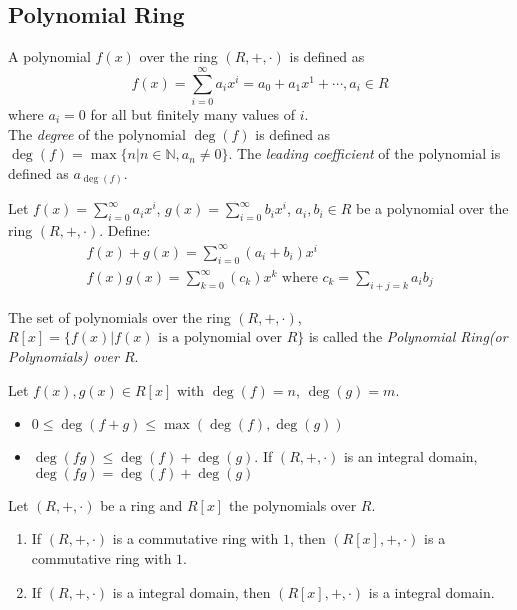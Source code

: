 \documentclass{report}
\begin{document}
		\subsection{Polynomial Ring}
		\begin{defn} \label{def_polynomial}
			A polynomial $f(x)$ over the ring $(R,+,\cdot)$ is defined as
			\begin{displaymath}
				f(x)=\sum_{i=0}^{\infty}a_ix^i=a_0+a_1x^1+\cdots,a_i\in R
			\end{displaymath}
			where $a_i=0$ for all but finitely many values of $i$.\\
			The \emph{degree} of the polynomial $\deg(f)$ is defined as $\deg(f)=\max\{n|n\in\mathbb{N}, a_n\ne0 \}$.
			The \emph{leading coefficient} of the polynomial is defined as $a_{\deg(f)}$.
		\end{defn}
		\begin{defn} \label{def_add_mult_polynomial}
			Let $f(x)=\sum_{i=0}^{\infty}a_ix^i$, $g(x)=\sum_{i=0}^{\infty}b_ix^i$, $a_i,b_i \in R$ be a polynomial over the ring $(R,+,\cdot)$. Define:
			\begin{gather*}
				f(x)+g(x)=\sum_{i=0}^{\infty}(a_i+b_i)x^i\\
				f(x)g(x)=\sum_{k=0}^{\infty}(c_k)x^k \text{ where } c_k=\sum_{i+j=k}a_ib_j
			\end{gather*}
		\end{defn}
		\begin{defn} \label{def_polynomial_ring}
			The set of polynomials over the ring $(R,+,\cdot)$, $R[x]=\{f(x)|f(x) \text{ is a polynomial over } R \}$ is called the \emph{Polynomial Ring(or Polynomials) over $R$}.
		\end{defn}
		\begin{thm} \label{thm_add_mult_deg}
			Let $f(x),g(x) \in R[x]$ with $\deg(f)=n$, $\deg(g)=m$.
			\begin{itemize}
				\item $0 \le \deg(f+g) \le \max(\deg(f),\deg(g))$
				\item $\deg(fg) \le \deg(f)+\deg(g)$.
				\subitem If $(R,+,\cdot)$ is an integral domain, $\deg(fg) = \deg(f)+\deg(g)$
			\end{itemize}
		\end{thm}
		\begin{thm} \label{thm_ring_polynomial_relationship}
			Let $(R,+,\cdot)$ be a ring and $R[x]$ the polynomials over $R$.
			\begin{enumerate}
				\item If $(R,+,\cdot)$ is a commutative ring with $1$, then $(R[x],+,\cdot)$ is a commutative ring with $1$.
				\item If $(R,+,\cdot)$ is a integral domain, then $(R[x],+,\cdot)$ is a integral domain.
			\end{enumerate}
		\end{thm}
\end{document}
